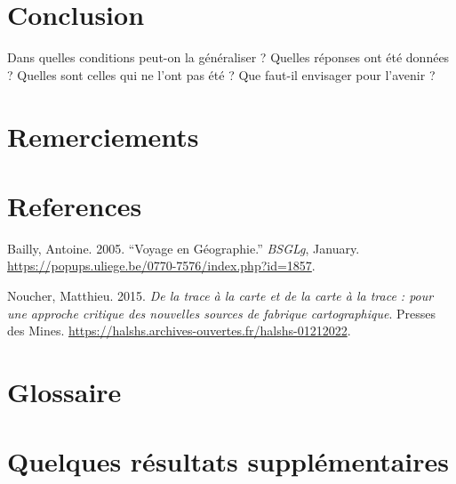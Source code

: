 \documentclass[
  12pt,
  a4paper,
]{scrbook}
\newlength{\cslhangindent}
\newlength{\cslentryspacingunit} %
\newenvironment{CSLReferences}[2] %
 {%
  \setlength{\parindent}{0pt}
  \ifodd #1
  \let\oldpar\par
  \def\par{\hangindent=\cslhangindent\oldpar}
  \fi
  \setlength{\parskip}{#2\cslentryspacingunit}
 }%
 {}
\begin{document}

\hypertarget{conclusion}{%
\chapter*{Conclusion}\label{conclusion}}

Dans quelles conditions peut-on la généraliser ? Quelles réponses ont
été données ? Quelles sont celles qui ne l'ont pas été ? Que faut-il
envisager pour l'avenir ?


\hypertarget{remerciements}{%
\chapter*{Remerciements}\label{remerciements}}


\hypertarget{references}{%
\chapter*{References}\label{references}}

\hypertarget{refs}{}
\begin{CSLReferences}{1}{0}
\leavevmode{}%
Bailly, Antoine. 2005. {``Voyage en Géographie.''} \emph{BSGLg},
January. \url{https://popups.uliege.be/0770-7576/index.php?id=1857}.

\leavevmode{}%
Noucher, Matthieu. 2015. \emph{De la trace à la carte et de la carte à
la trace : pour une approche critique des nouvelles sources de fabrique
cartographique}. Presses des Mines.
\url{https://halshs.archives-ouvertes.fr/halshs-01212022}.

\end{CSLReferences}

\appendix
{}

\hypertarget{glossaire}{%
\chapter*{Glossaire}\label{glossaire}}

\hypertarget{quelques-ruxe9sultats-suppluxe9mentaires}{%
\chapter*{Quelques résultats
supplémentaires}\label{quelques-ruxe9sultats-suppluxe9mentaires}}
\end{document}
